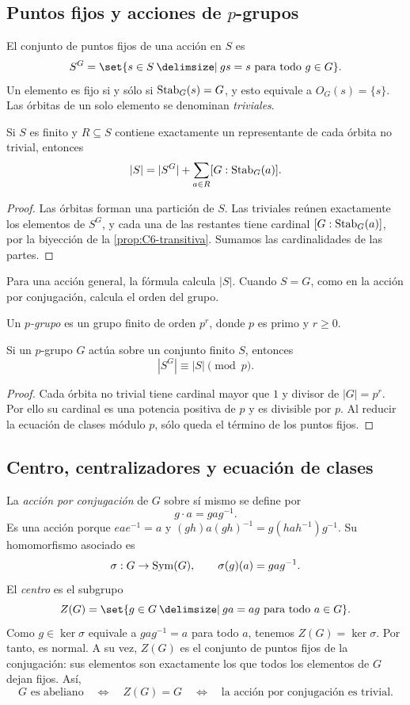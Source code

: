 \subsection{Puntos fijos y acciones de \texorpdfstring{$p$}{p}-grupos}\label{tema:6-2-1}
El conjunto de puntos fijos de una acción en $S$ es
\[
S^G=\set{s\in S\given gs=s\text{ para todo }g\in G}.
\]
Un elemento es fijo si y sólo si $\operatorname{Stab}_G(s)=G$, y esto equivale a $O_G(s)=\{s\}$. Las órbitas de un solo elemento se denominan \emph{triviales}.

\begin{prop}\label{prop:C6-ecuacion}
Si $S$ es finito y $R\subseteq S$ contiene exactamente un representante de cada órbita no trivial, entonces
\[
|S|=|S^G|+\sum_{a\in R}[G:\operatorname{Stab}_G(a)].
\]
\end{prop}
\begin{proof}
Las órbitas forman una partición de $S$. Las triviales reúnen exactamente los elementos de $S^G$, y cada una de las restantes tiene cardinal $[G:\operatorname{Stab}_G(a)]$, por la biyección de la \cref{prop:C6-transitiva}. Sumamos las cardinalidades de las partes.
\end{proof}
\begin{obs}
Para una acción general, la fórmula calcula $|S|$. Cuando $S=G$, como en la acción por conjugación, calcula el orden del grupo.
\end{obs}

\begin{defi}
Un \emph{$p$-grupo} es un grupo finito de orden $p^r$, donde $p$ es primo y $r\ge0$.
\end{defi}
\begin{coro}\label{coro:C6-fijos}
Si un $p$-grupo $G$ actúa sobre un conjunto finito $S$, entonces
\[
|S^G|\equiv|S|\pmod p.
\]
\end{coro}
\begin{proof}
Cada órbita no trivial tiene cardinal mayor que $1$ y divisor de $|G|=p^r$. Por ello su cardinal es una potencia positiva de $p$ y es divisible por $p$. Al reducir la ecuación de clases módulo $p$, sólo queda el término de los puntos fijos.
\end{proof}

\subsection{Centro, centralizadores y ecuación de clases}\label{tema:6-2-2}\label{tema:6-2-3}
La \emph{acción por conjugación} de $G$ sobre sí mismo se define por
\[
g\cdot a=gag^{-1}.
\]
Es una acción porque $eae^{-1}=a$ y $(gh)a(gh)^{-1}=g(hah^{-1})g^{-1}$. Su homomorfismo asociado es
\[
\sigma:G\to\operatorname{Sym}(G),\qquad \sigma(g)(a)=gag^{-1}.
\]
El \emph{centro} es el subgrupo
\[
Z(G)=\set{g\in G\given ga=ag\text{ para todo }a\in G}.
\]
Como $g\in\ker\sigma$ equivale a $gag^{-1}=a$ para todo $a$, tenemos $Z(G)=\ker\sigma$. Por tanto, es normal. A su vez, $Z(G)$ es el conjunto de puntos fijos de la conjugación: sus elementos son exactamente los que todos los elementos de $G$ dejan fijos. Así,
\[
G\text{ es abeliano}\quad\Longleftrightarrow\quad Z(G)=G
\quad\Longleftrightarrow\quad\text{la acción por conjugación es trivial}.
\]

